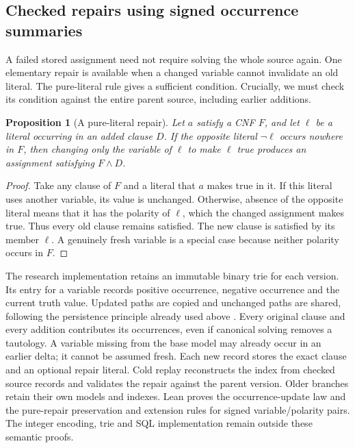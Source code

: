\documentclass[11pt,a4paper]{article}
\numberwithin{equation}{section}
\theoremstyle{plain}
\newtheorem{proposition}[lemma]{Proposition}
\theoremstyle{definition}
\theoremstyle{remark}
\begin{document}
\subsection{Checked repairs using signed occurrence summaries}
\label{sec:repair-history}

A failed stored assignment need not require solving the whole source again. One elementary repair is available when a changed variable cannot invalidate an old literal. The pure-literal rule gives a sufficient condition. Crucially, we must check its condition against the entire parent source, including earlier additions.

\begin{proposition}[A pure-literal repair]
\label{prop:pure-repair}
Let $a$ satisfy a CNF $F$, and let $\ell$ be a literal occurring in an added clause $D$. If the opposite literal $\neg\ell$ occurs nowhere in $F$, then changing only the variable of $\ell$ to make $\ell$ true produces an assignment satisfying $F\land D$.
\end{proposition}

\begin{proof}
Take any clause of $F$ and a literal that $a$ makes true in it. If this literal uses another variable, its value is unchanged. Otherwise, absence of the opposite literal means that it has the polarity of $\ell$, which the changed assignment makes true. Thus every old clause remains satisfied. The new clause is satisfied by its member $\ell$. A genuinely fresh variable is a special case because neither polarity occurs in $F$.
\end{proof}

The research implementation retains an immutable binary trie for each version. Its entry for a variable records positive occurrence, negative occurrence and the current truth value. Updated paths are copied and unchanged paths are shared, following the persistence principle already used above \citep{driscoll1989persistent}. Every original clause and every addition contributes its occurrences, even if canonical solving removes a tautology. A variable missing from the base model may already occur in an earlier delta; it cannot be assumed fresh. Each new record stores the exact clause and an optional repair literal. Cold replay reconstructs the index from checked source records and validates the repair against the parent version. Older branches retain their own models and indexes. Lean proves the occurrence-update law and the pure-repair preservation and extension rules for signed variable/polarity pairs. The integer encoding, trie and SQL implementation remain outside these semantic proofs.
\end{document}
